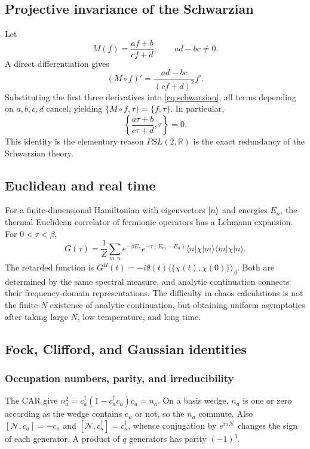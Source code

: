 \documentclass[11pt]{article}
\numberwithin{equation}{section}
\theoremstyle{exposition}
\theoremstyle{result}
\newcommand{\R}{\mathbb R}
\begin{document}
\subsection[Schwarzian invariance]{Projective invariance of the Schwarzian}

Let
\begin{equation*}
M(f)=\frac{af+b}{cf+d},
\qquad ad-bc\ne0.
\end{equation*}
A direct differentiation gives
\begin{equation*}
(M\circ f)'=\frac{ad-bc}{(cf+d)^2}f'.
\end{equation*}
Substituting the first three derivatives into \eqref{eq:schwarzian}, all terms depending on $a,b,c,d$ cancel, yielding $\{M\circ f,\tau\}=\{f,\tau\}$. In particular,
\begin{equation*}
\left\{\frac{a\tau+b}{c\tau+d},\tau\right\}=0.
\end{equation*}
This identity is the elementary reason $PSL(2,\R)$ is the exact redundancy of the Schwarzian theory.

\subsection{Euclidean and real time}

For a finite-dimensional Hamiltonian with eigenvectors $\ket n$ and energies $E_n$, the thermal Euclidean correlator of fermionic operators has a Lehmann expansion. For $0<\tau<\beta$,
\begin{equation*}
G(\tau)
=\frac1Z\sum_{m,n}
e^{-\beta E_n}e^{-\tau(E_m-E_n)}
\langle n|\chi|m\rangle\langle m|\chi|n\rangle.
\end{equation*}
The retarded function is $G^R(t)=-i\theta(t)\langle\{\chi(t),\chi(0)\}\rangle_\beta$. Both are determined by the same spectral measure, and analytic continuation connects their frequency-domain representations. The difficulty in chaos calculations is not the finite-$N$ existence of analytic continuation, but obtaining uniform asymptotics after taking large $N$, low temperature, and long time.

\subsection{Fock, Clifford, and Gaussian identities}\label{app:algebraDetails}

\subsubsection{Occupation numbers, parity, and irreducibility}
The CAR give $n_a^2=c_a^\dagger(1-c_a^\dagger c_a)c_a=n_a$. On a basis wedge, $n_a$ is one or zero according as the wedge contains $e_a$ or not, so the $n_a$ commute. Also $[\mathcal N,c_a]=-c_a$ and $[\mathcal N,c_a^\dagger]=c_a^\dagger$, whence conjugation by $e^{i\pi\mathcal N}$ changes the sign of each generator. A product of $q$ generators has parity $(-1)^q$.
\end{document}

